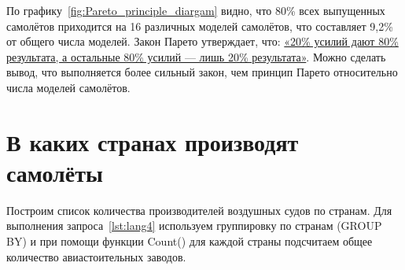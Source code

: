 \begin{figure*}[h]

    \setlength{\fboxsep}{0pt}%
    \setlength{\fboxrule}{1pt}%

	\caption{Процентное соотношение количества выпущенных моделей самолётов по n моделям к общему числу выпущенных самолётов за всё время, 2020.}%
    \label{fig:Pareto_principle_diargam}%
\end{figure*}

По графику~\ref{fig:Pareto_principle_diargam} видно, что 80\% всех выпущенных самолётов приходится на 16 различных моделей самолётов, что составляет 9,2\% от общего числа моделей. Закон Парето утверждает, что: \href{https://clck.ru/JvaaU}{«20\% усилий дают 80\% результата, а остальные 80\% усилий — лишь 20\% результата»}. Можно сделать вывод, что выполняется более сильный закон, чем принцип Парето относительно числа моделей самолётов.

\section{В каких странах производят самолёты}

\label{aircraft_question_3}

Построим список количества производителей воздушных судов по странам. Для выполнения запроса~\ref{lst:lang4} используем группировку по странам (GROUP BY) и при помощи функции Count() для каждой страны подсчитаем общее количество авиастоительных заводов.

